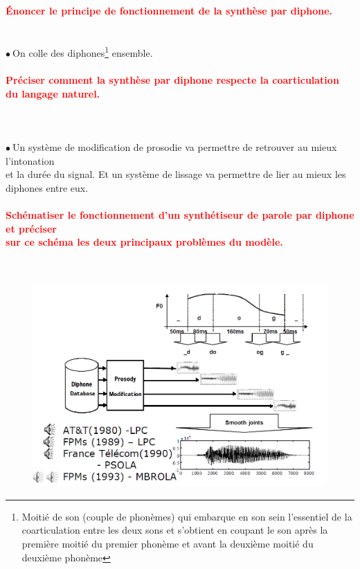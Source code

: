 \documentclass[letterpaper, 12pt]{article}
\newcommand{\alinea}{
\hspace*{0.3cm}}
\newcommand{\red}[1]{
	\textcolor{red}{#1}
}
\newcommand{\point}{$\bullet\ $}
\begin{document}
		\paragraph{\red{Énoncer le principe de fonctionnement de la synthèse par diphone.}}~\\
			\point On colle des diphones\footnote{Moitié de son (couple de phonèmes) qui 
					embarque en son sein l'essentiel de la coarticulation entre les deux sons et s'obtient en 
					coupant le son après la première 
					moitié du premier phonème et avant la deuxième moitié du deuxième phonème} ensemble.
		\paragraph{\red{Préciser comment la synthèse par diphone respecte la coarticulation du langage naturel.}}
		~\\~\\
			\point Un système de modification de prosodie va permettre de retrouver au mieux l'intonation  
				\\\alinea et la durée du signal. Et un système de lissage va permettre de lier au mieux les 
				\\\alinea diphones entre eux.
		\paragraph{\red{ Schématiser le fonctionnement d'un synthétiseur de parole par diphone et préciser 
		~\\ \hspace*{0.035cm} sur ce schéma les deux principaux problèmes du modèle.}}~\\
			\begin{figure}[H]
				\centering
				\includegraphics[scale=0.5]{Images/diphone}
			\end{figure}\noindent
\end{document}
